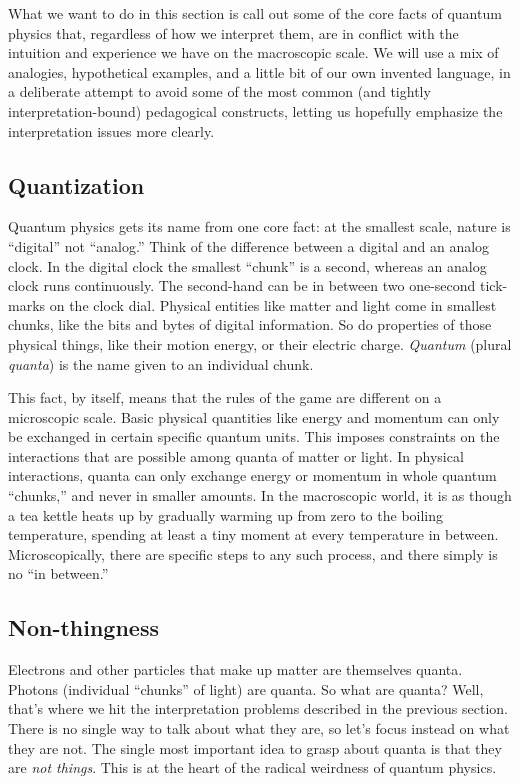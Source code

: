 \documentclass[12pt,onecolumn,preprintnumbers,amsmath,amssymbn,reprint,nofootinbib,superscriptaddress]{revtex4}    %
\begin{document}
What we want to do in this section is call out some of the core facts of quantum physics that, regardless of how we interpret them, are in conflict with the intuition and experience we have on the macroscopic scale.  We will use a mix of analogies, hypothetical examples, and a little bit of our own invented language, in a deliberate attempt to avoid some of the most common (and tightly interpretation-bound) pedagogical constructs, letting us hopefully emphasize the interpretation issues more clearly.

\subsection{Quantization}
\label{quantization}

Quantum physics gets its name from one core fact:  at the smallest scale, nature is ``digital'' not ``analog.'' Think of the difference between a digital and an analog clock. In the digital clock the smallest ``chunk'' is a second, whereas an analog clock runs continuously.  The second-hand can be in between two one-second tick-marks on the clock dial. Physical entities like matter and light come in smallest chunks, like the bits and bytes of digital information.  So do properties of those physical things, like their motion energy, or their electric charge.  {\em Quantum} (plural {\em quanta}) is the name given to an individual chunk.

This fact, by itself, means that the rules of the game are different on a microscopic scale. Basic physical quantities like energy and momentum can only be exchanged in certain specific quantum units.  This imposes constraints on the interactions that are possible among quanta of matter or light.  In physical interactions, quanta can only exchange energy or momentum in whole quantum ``chunks,'' and never in smaller amounts.  In the macroscopic world, it is as though a tea kettle heats up by gradually warming up from zero to the boiling temperature, spending at least a tiny moment at every temperature in between.  Microscopically, there are specific steps to any such process, and there simply is no ``in between.'' 
\subsection{Non-thingness}
\label{nonthingess}

Electrons and other particles that make up matter are themselves quanta.  Photons (individual ``chunks'' of light) are quanta.  So what are quanta?  Well, that's where we hit the interpretation problems described in the previous section.  There is no single way to talk about what they are, so let's focus instead on what they are not.  The single most important idea to grasp about quanta is that they are {\em not things}.  This is at the heart of the radical weirdness of quantum physics.
\end{document}
